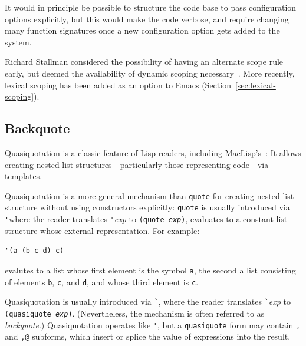\documentclass[format=acmsmall, review]{acmart}
\begin{document}
It would in principle be
possible to structure the code base to pass configuration options
explicitly, but this would make the code verbose, and require changing
many function signatures once a new configuration option gets added to
the system.

Richard Stallman considered the possibility of having an alternate
scope rule early, but deemed the availability of dynamic scoping
necessary~\cite{Stallman1981}.  More recently, lexical scoping has
been added as an option to Emacs
(Section~\ref{sec:lexical-scoping}).

\subsection{Backquote}
\label{sec:backquote}

Quasiquotation is a classic feature of Lisp readers, including
MacLisp's~\cite{Bawden1999}: It allows creating nested list
structures---particularly those representing code---via templates.

Quasiquotation is a more general mechanism than \texttt{quote} for
creating nested list structure without using constructors explicitly:
\texttt{quote} is usually introduced via \verb|'|where the reader
translates \verb|'|\textit{exp} to \texttt{(quote \textit{exp})},
evaluates to a constant list structure whose external representation.
For example:
%
\begin{verbatim}
'(a (b c d) c)
\end{verbatim}
%
evalutes to a list whose first element is the symbol \texttt{a}, the
second a list consisting of elements \texttt{b}, \texttt{c}, and
\texttt{d}, and whose third element is \texttt{c}.

Quasiquotation is usually introduced via \verb|`|,
where the reader translates \verb|`|\textit{exp} to
\texttt{(quasiquote \textit{exp})}.  (Nevertheless, the mechanism is
often referred to as \textit{backquote}.)  Quasiquotation operates like
\verb|'|, but a \texttt{quasiquote} form may contain \texttt{,} and \texttt{,@}
subforms, which insert or splice the value of expressions into the
result.
\end{document}
